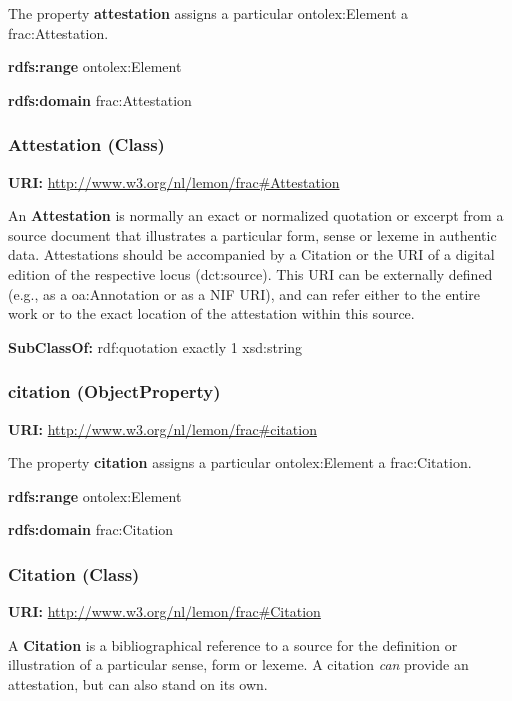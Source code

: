 \documentclass[a4paper]{article}
\newcommand\textstyleStrongEmphasis[1]{\textbf{#1}}
\newcommand\textstyleTeletype[1]{\textrm{#1}}
\begin{document}
The property \textstyleStrongEmphasis{attestation} assigns a particular ontolex:Element a frac:Attestation.

\textstyleStrongEmphasis{rdfs:range} ontolex:Element

\textstyleStrongEmphasis{rdfs:domain} frac:Attestation

\subsubsection[Attestation (Class)]{Attestation (Class)}
\textstyleStrongEmphasis{URI:} \url{http://www.w3.org/nl/lemon/frac#Attestation}

An \textstyleStrongEmphasis{Attestation} is normally an exact or normalized quotation or excerpt from a source document that illustrates a particular form, sense or lexeme in authentic data. Attestations should be accompanied by a \textstyleTeletype{Citation} or the URI of a digital edition of the respective locus (\textstyleTeletype{dct:source}). This URI can be externally defined (e.g., as a \textstyleTeletype{oa:Annotation} or as a NIF URI), and can refer either to the entire work or to the exact location of the attestation within this source. 

\textstyleStrongEmphasis{SubClassOf:} rdf:quotation exactly 1 xsd:string

\subsubsection[citation (ObjectProperty)]{citation (ObjectProperty)}
\textstyleStrongEmphasis{URI:} \url{http://www.w3.org/nl/lemon/frac#citation}

The property \textstyleStrongEmphasis{citation} assigns a particular ontolex:Element a frac:Citation.

\textstyleStrongEmphasis{rdfs:range} ontolex:Element

\textstyleStrongEmphasis{rdfs:domain} frac:Citation

\subsubsection[Citation (Class)]{Citation (Class)}
\textstyleStrongEmphasis{URI:} \url{http://www.w3.org/nl/lemon/frac#Citation}

A \textstyleStrongEmphasis{Citation} is a bibliographical reference to a source for the definition or illustration of a particular sense, form or lexeme. A citation \textit{can} provide an attestation, but can also stand on its own. 
\end{document}
